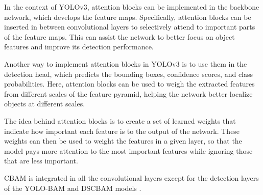 In the context of YOLOv3, attention blocks can be implemented in the backbone network, which develops the feature maps. Specifically, attention blocks can be inserted in between convolutional layers to selectively attend to important parts of the feature maps. This can assist the network to better focus on object features and improve its detection performance.

Another way to implement attention blocks in YOLOv3 is to use them in the detection head, which predicts the bounding boxes, confidence scores, and class probabilities. Here, attention blocks can be used to weigh the extracted features from different scales of the feature pyramid, helping the network better localize objects at different scales.

The idea behind attention blocks is to create a set of learned weights that indicate how important each feature is to the output of the network. These weights can then be used to weight the features in a given layer, so that the model pays more attention to the most important features while ignoring those that are less important.

CBAM is integrated in all the convolutional layers except for the detection layers of the YOLO-BAM and DSCBAM models \cite{chakarDepthwiseSeparableConvolutions2020}.
